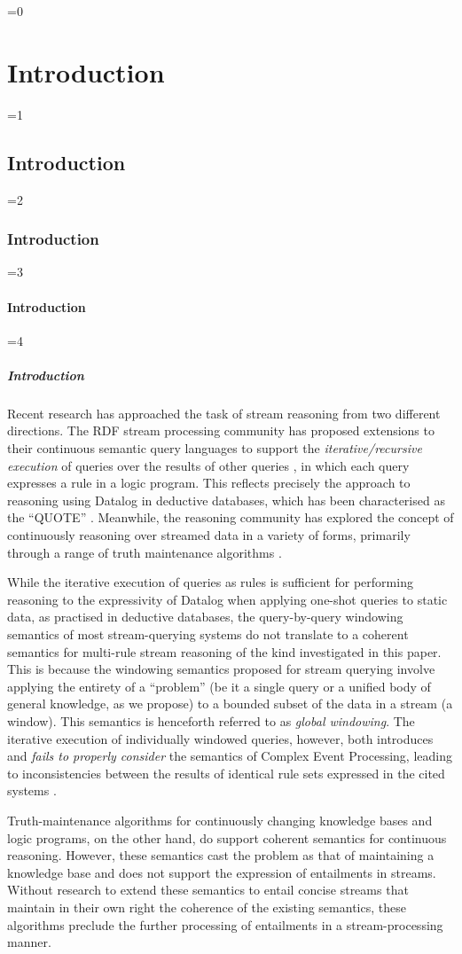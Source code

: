 \documentclass[twocolumn,preprint,3p,number]{elsarticle}
\theoremstyle{plain}
\theoremstyle{definition}
\newcounter{nestingdepth}
\newenvironment{nestedsection}[2]{
  \ifnum\value{nestingdepth}=0
    \chapter{#1}
  \else
    \ifnum\value{nestingdepth}=1
      \section{#1}
    \else
      \ifnum\value{nestingdepth}=2
        \subsection{#1}
      \else
        \ifnum\value{nestingdepth}=3
          \subsubsection{#1}
        \else
          \ifnum\value{nestingdepth}=4
            \paragraph{#1}
          \else
            \PackageError{nestedsections}{Maximum nesting level exceeded!}{uh oh!}
          \fi
        \fi
      \fi
    \fi
  \fi
  \addtocounter{nestingdepth}{1}
  \label{sec:#2}
}{\addtocounter{nestingdepth}{-1}}
\begin{document}
\begin{nestedsection}{Introduction}{intro}
  Recent research has approached the task of stream reasoning from two different directions.
  The RDF stream processing community has proposed extensions to their continuous semantic query languages to support the \emph{iterative/recursive execution} of queries over the results of other queries \citep{C-SPARQL,EP-SPARQL,walavalkar08streamingkb}, in which each query expresses a rule in a logic program.
  This reflects precisely the approach to reasoning using Datalog in deductive databases, which has been characterised as the ``QUOTE'' \citep{DATALOG CHARACTERISATION}.
  Meanwhile, the reasoning community has explored the concept of continuously reasoning over streamed data in a variety of forms, primarily through a range of truth maintenance algorithms \citep{dred,inc-materialisation,stream-truth-maintenance}.

  While the iterative execution of queries as rules is sufficient for performing reasoning to the expressivity of Datalog when applying one-shot queries to static data, as practised in deductive databases, the query-by-query windowing semantics of most stream-querying systems do not translate to a coherent semantics for multi-rule stream reasoning of the kind investigated in this paper.
  This is because the windowing semantics proposed for stream querying involve applying the entirety of a ``problem'' (be it a single query or a unified body of general knowledge, as we propose) to a bounded subset of the data in a stream (a window).
  This semantics is henceforth referred to as \emph{global windowing}.
  The iterative execution of individually windowed queries, however, both introduces and \emph{fails to properly consider} the semantics of Complex Event Processing, leading to inconsistencies between the results of identical rule sets expressed in the cited systems \citep{LARS}.
  
  Truth-maintenance algorithms for continuously changing knowledge bases and logic programs, on the other hand, do support coherent semantics for continuous reasoning.
  However, these semantics cast the problem as that of maintaining a knowledge base and does not support the expression of entailments in streams.
  Without research to extend these semantics to entail concise streams that maintain in their own right the coherence of the existing semantics, these algorithms preclude the further processing of entailments in a stream-processing manner.


\end{nestedsection}
\end{document}
